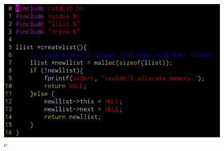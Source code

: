 \documentclass[12pt, aspectratio=169]{beamer}
\begin{document}
{{\begin{columns}
    \begin{column}{5cm}
  \begin{figure}[left]
   \includegraphics[scale=0.23]{c} 
    \caption{c}
    \label{fig:c}
  \end{figure}
    \end{column}
    

\end{columns}}}
\end{document}
